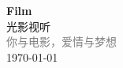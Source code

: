 \vspace*{\fill}
\begin{center}
    \textcolor{blue!50}{\Huge\textbf{Film}} \\[1em]
    \textcolor{blue!60!pink}{\Large 光影视听} \\[2em]
    \textcolor{gray}{\large 你与电影，爱情与梦想} \\[1em]
    \today
\end{center}
\vspace*{\fill}
\clearpage


\clearpage

\clearpage
